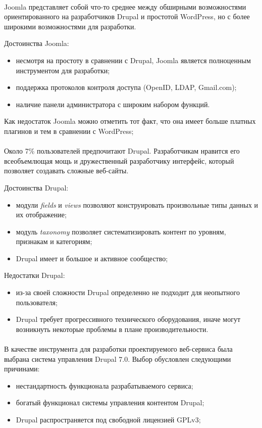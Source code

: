 \paragraph{} 
Joomla представляет собой что-то среднее между обширными возможностями
ориентированного на разработчиков Drupal и простотой WordPress,
но с более широкими возможностями для разработки.

Достоинства Joomla:
\begin{itemize}
\item
  несмотря на простоту в сравнении с Drupal, Joomla является полноценным инструментом для разработки;
\item
  поддержка протоколов контроля доступа (OpenID, LDAP, Gmail.com);
\item
  наличие панели администратора с широким набором функций.
\end{itemize}

Как недостаток Joomla можно отметить тот факт, что она имеет
больше платных плагинов и тем в сравнении с WordPress;

\paragraph{}
Около 7\% пользователей предпочитают Drupal. Разработчикам нравится его всеобъемлющая мощь
и дружественный разработчику интерфейс, который позволяет создавать сложные веб-сайты.

Достоинства Drupal:
\begin{itemize}
\item
  модули \textit{fields} и \textit{views} позволяют конструировать произвольные типы данных и их отображение;
\item
  модуль \textit{taxonomy} позволяет систематизировать контент по уровням, признакам и категориям;
\item
  Drupal имеет и большое и активное сообщество;
\end{itemize}

Недостатки Drupal:
\begin{itemize}
\item 
  из-за своей сложности Drupal определенно не подходит для неопытного пользователя;
\item
  Drupal требует прогрессивного технического оборудования,
  иначе могут возникнуть некоторые проблемы в плане производительности.
\end{itemize}

\paragraph{}
В качестве инструмента для разработки проектируемого веб-сервиса была выбрана система управления Drupal 7.0.
Выбор обусловлен следующими причинами:
\begin{itemize}
\item
  нестандартность функционала разрабатываемого сервиса;
\item
  богатый функционал системы управления контентом Drupal;
\item 
  Drupal распространяется под свободной лицензией GPLv3;
\end{itemize}  

